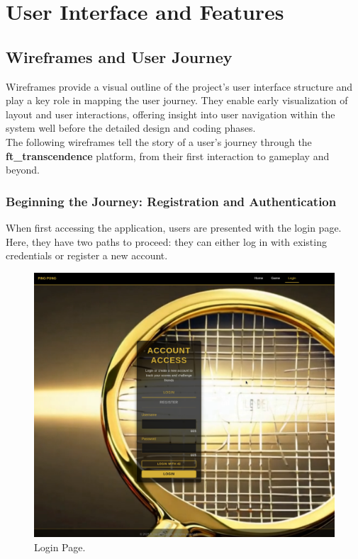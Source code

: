 \chapter{User Interface and Features}

\section{Wireframes and User Journey}

Wireframes provide a visual outline of the project's user interface structure and play a key role in mapping the user journey. They enable early visualization of layout and user interactions, offering insight into user navigation within the system well before the detailed design and coding phases.\\
The following wireframes tell the story of a user's journey through the \textbf{ft\_transcendence} platform, from their first interaction to gameplay and beyond.

\subsection{Beginning the Journey: Registration and Authentication}

When first accessing the application, users are presented with the login page. Here, they have two paths to proceed: they can either log in with existing credentials or register a new account.

\begin{figure}[H]
    \centering
    \includegraphics[width=0.7\linewidth]{Figures/images/new_images/LoginPage.png}
    \caption{Login Page.} %
    \label{fig:login-page}
\end{figure}

